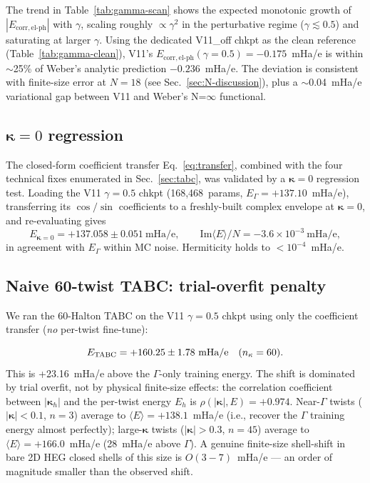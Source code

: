 \documentclass[reprint,amsmath,amssymb,aps,prb,floatfix,nofootinbib]{revtex4-2}
\newcommand{\Ehp}{E_{\mathrm{corr},\mathrm{el}\text{-}\mathrm{ph}}}
\begin{document}
The trend in Table~\ref{tab:gamma-scan} shows the expected monotonic
growth of $|\Ehp|$ with $\gamma$, scaling roughly $\propto \gamma^2$
in the perturbative regime ($\gamma \lesssim 0.5$) and saturating at
larger $\gamma$.  Using the dedicated V11\_off chkpt as the clean
reference (Table~\ref{tab:gamma-clean}), V11's
$\Ehp(\gamma{=}0.5) = -0.175$~mHa/e is within $\sim$25\% of Weber's
analytic prediction $-0.236$~mHa/e.  The deviation is consistent
with finite-size error at $N=18$ (see Sec.~\ref{sec:N-discussion}),
plus a $\sim$0.04~mHa/e variational gap between V11 and Weber's
N=$\infty$ functional.

\subsection{$\bm\kappa{=}0$ regression}\label{sec:results-kzero}
The closed-form coefficient transfer Eq.~\eqref{eq:transfer},
combined with the four technical fixes enumerated in
Sec.~\ref{sec:tabc}, was validated by a $\bm\kappa = 0$ regression
test.  Loading the V11 $\gamma = 0.5$ chkpt
(168{,}468~params, $E_\Gamma = +137.10$~mHa/e), transferring its
$\cos/\sin$ coefficients to a freshly-built complex envelope at
$\bm\kappa = 0$, and re-evaluating gives
\begin{equation*}
E_{\bm\kappa = 0} = +137.058\pm 0.051~\text{mHa/e},
\qquad
\mathrm{Im}\langle E\rangle/N = -3.6\times 10^{-3}~\text{mHa/e},
\end{equation*}
in agreement with $E_\Gamma$ within MC noise.  Hermiticity holds to
$<10^{-4}$~mHa/e.

\subsection{Naive 60-twist TABC: trial-overfit penalty}\label{sec:results-tabc-naive}
We ran the 60-Halton TABC on the V11 $\gamma = 0.5$ chkpt using only
the coefficient transfer (\emph{no} per-twist fine-tune):

\begin{equation}
E_{\rm TABC} = +160.25 \pm 1.78~\text{mHa/e}\quad
(n_\kappa = 60).
\end{equation}
This is +23.16~mHa/e above the $\Gamma$-only training energy.  The
shift is dominated by trial overfit, not by physical
finite-size effects: the correlation coefficient between
$|\bm\kappa_h|$ and the per-twist energy $E_h$ is
$\rho(|\bm\kappa|, E) = +0.974$.  Near-$\Gamma$ twists
($|\bm\kappa| < 0.1$, $n = 3$) average to $\langle E\rangle =
+138.1$~mHa/e (i.e., recover the $\Gamma$ training energy almost
perfectly); large-$\bm\kappa$ twists ($|\bm\kappa| > 0.3$, $n = 45$)
average to $\langle E\rangle = +166.0$~mHa/e (28~mHa/e above
$\Gamma$).  A genuine finite-size shell-shift in bare 2D HEG closed
shells of this size is $O(3{-}7)$~mHa/e --- an order of magnitude
smaller than the observed shift.
\end{document}
